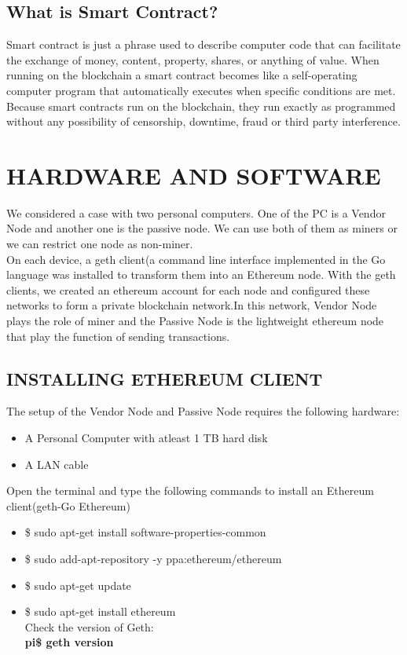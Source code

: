 \documentclass[journal,12pt,twocolumn]{IEEEtran}
\begin{document}
\subsection{What is Smart Contract?}

Smart contract is just a phrase used to describe computer code that can facilitate the exchange of money, content, property, shares, or anything of value. When running on the blockchain a smart contract becomes like a self-operating computer program that automatically executes when specific conditions are met. Because smart contracts run on the blockchain, they run exactly as programmed without any possibility of censorship, downtime, fraud or third party interference.

\section{HARDWARE AND SOFTWARE}

We considered a case with two personal computers. One of the PC is a Vendor Node and another one is the passive node. We can use both of them as miners or we can restrict one node as non-miner. \\

On each device, a geth client(a command line interface implemented in the Go language was installed to transform them into an Ethereum node. With the geth clients, we created an ethereum account for each node and configured these networks to form a private blockchain network.In this network, Vendor Node plays the role of miner and the Passive Node is the lightweight ethereum node that play the function of sending transactions.

\subsection{INSTALLING ETHEREUM CLIENT} 
The setup of the Vendor Node and Passive Node requires the following hardware:
\begin{itemize}
  \item A Personal Computer with atleast 1 TB hard 			disk
  \item A LAN cable
  \end{itemize}
Open the terminal and type the following commands to install an Ethereum client(geth-Go Ethereum)
\begin{itemize}
\item \$ sudo apt-get install software-properties-common
\item  \$ sudo add-apt-repository -y  ppa:ethereum/ethereum
\item \$ sudo apt-get update
\item \$ sudo apt-get install ethereum\\

Check the version of Geth:\\
\textbf{pi\$ geth version}\\
\end{itemize}
\end{document}
